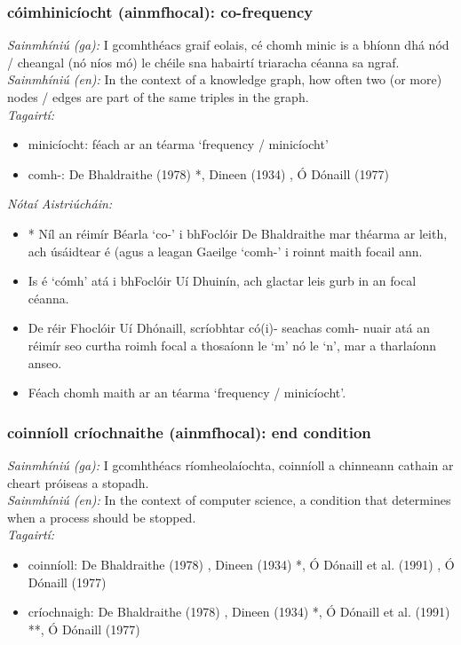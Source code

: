 \documentclass{article}
\begin{document}
\subsubsection*{cóimhinicíocht (ainmfhocal): co-frequency}
 \noindent \textit{Sainmhíniú (ga):} I gcomhthéacs graif eolais, cé chomh minic is a bhíonn dhá nód / cheangal (nó níos mó) le chéile sna habairtí triaracha céanna sa ngraf.
\\
 \noindent \textit{Sainmhíniú (en):} In the context of a knowledge graph, how often two (or more) nodes / edges are part of the same triples in the graph.
\\
 \noindent \textit{Tagairtí:}
\begin{itemize}
	\item minicíocht: féach ar an téarma `frequency / minicíocht'
	\item comh-: De Bhaldraithe (1978) \cite{de-bhaldraithe}*, Dineen (1934) \cite{dineen}, Ó Dónaill (1977) \cite{odonaill}
\end{itemize}

 \noindent \textit{Nótaí Aistriúcháin:}
\begin{itemize}
	\item * Níl an réimír Béarla `co-' i bhFoclóir De Bhaldraithe mar théarma ar leith, ach úsáidtear é (agus a leagan Gaeilge `comh-' i roinnt maith focail ann.
	\item Is é `cómh' atá i bhFoclóir Uí Dhuinín, ach glactar leis gurb in an focal céanna.
	\item De réir Fhoclóir Uí Dhónaill, scríobhtar có(i)- seachas comh- nuair atá an réimír seo curtha roimh focal a thosaíonn le `m' nó le `n', mar a tharlaíonn anseo.
	\item Féach chomh maith ar an téarma `frequency / minicíocht'.
\end{itemize}


\subsubsection*{coinníoll críochnaithe (ainmfhocal): end condition}
 \noindent \textit{Sainmhíniú (ga):} I gcomhthéacs ríomheolaíochta, coinníoll a chinneann cathain ar cheart próiseas a stopadh.
\\
 \noindent \textit{Sainmhíniú (en):} In the context of computer science, a condition that determines when a process should be stopped.
\\
 \noindent \textit{Tagairtí:}
\begin{itemize}
	\item coinníoll: De Bhaldraithe (1978) \cite{de-bhaldraithe}, Dineen (1934) \cite{dineen}*, Ó Dónaill et al. (1991) \cite{focloir-beag}, Ó Dónaill (1977) \cite{odonaill}
	\item críochnaigh: De Bhaldraithe (1978) \cite{de-bhaldraithe}, Dineen (1934) \cite{dineen}*, Ó Dónaill et al. (1991) \cite{focloir-beag}**, Ó Dónaill (1977) \cite{odonaill}
\end{itemize}
\end{document}

